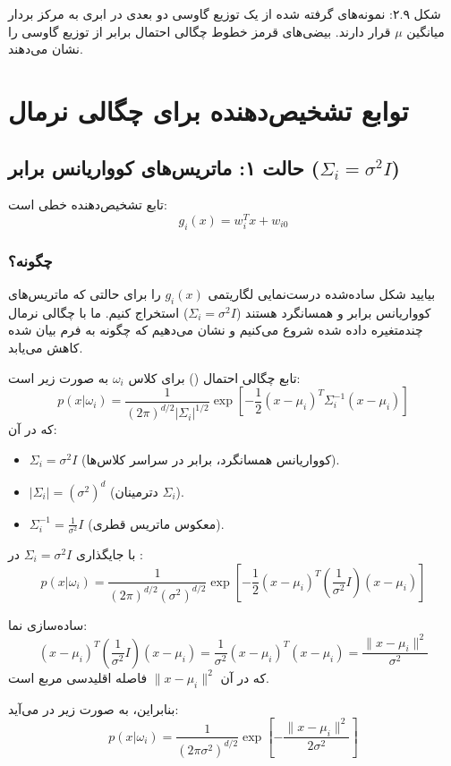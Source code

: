 \documentclass{article}
\begin{document}
شکل ۲.۹: نمونه‌های گرفته شده از یک توزیع گاوسی دو بعدی در ابری به مرکز بردار میانگین $\mu$ قرار دارند. بیضی‌های قرمز خطوط چگالی احتمال برابر از توزیع گاوسی را نشان می‌دهند.

\section*{توابع تشخیص‌دهنده برای چگالی نرمال}

\subsection*{حالت ۱: ماتریس‌های کوواریانس برابر ($\Sigma_i = \sigma^2 I$)}
تابع تشخیص‌دهنده خطی است:
\[
g_i(x) = w_i^T x + w_{i0}
\]

\subsubsection*{چگونه؟}
بیایید شکل ساده‌شده درست‌نمایی لگاریتمی $g_i(x)$ را برای حالتی که ماتریس‌های کوواریانس برابر و همسانگرد هستند ($\Sigma_i = \sigma^2 I$) استخراج کنیم. ما با چگالی نرمال چندمتغیره داده شده شروع می‌کنیم و نشان می‌دهیم که چگونه به فرم بیان شده کاهش می‌یابد.

تابع چگالی احتمال () برای کلاس $\omega_i$ به صورت زیر است:
\[
p(x|\omega_i) = \frac{1}{(2\pi)^{d/2}|\Sigma_i|^{1/2}} \exp\left[ -\frac{1}{2}(x-\mu_i)^T\Sigma_i^{-1}(x-\mu_i) \right]
\]
که در آن:
\begin{itemize}
    \item $\Sigma_i = \sigma^2 I$ (کوواریانس همسانگرد، برابر در سراسر کلاس‌ها).
    \item $|\Sigma_i| = (\sigma^2)^d$ (دترمینان $\Sigma_i$).
    \item $\Sigma_i^{-1} = \frac{1}{\sigma^2} I$ (معکوس ماتریس قطری).
\end{itemize}

با جایگذاری $\Sigma_i = \sigma^2 I$ در :
\[
p(x|\omega_i) = \frac{1}{(2\pi)^{d/2}(\sigma^2)^{d/2}} \exp\left[ -\frac{1}{2}(x-\mu_i)^T \left( \frac{1}{\sigma^2} I \right)(x-\mu_i) \right]
\]

ساده‌سازی نما:
\[
(x-\mu_i)^T \left( \frac{1}{\sigma^2} I \right)(x-\mu_i) = \frac{1}{\sigma^2} (x-\mu_i)^T(x-\mu_i) = \frac{\|x-\mu_i\|^2}{\sigma^2}
\]
که در آن $\|x-\mu_i\|^2$ فاصله اقلیدسی مربع است.

بنابراین،  به صورت زیر در می‌آید:
\[
p(x|\omega_i) = \frac{1}{(2\pi\sigma^2)^{d/2}} \exp\left[ -\frac{\|x-\mu_i\|^2}{2\sigma^2} \right]
\]
\end{document}
